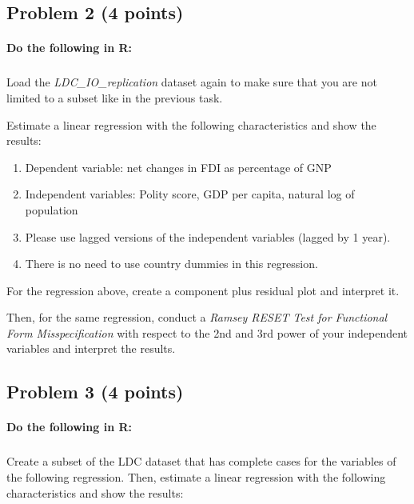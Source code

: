 \documentclass[12pt]{article}
\begin{document}
\subsection*{Problem 2 (4 points)}

\paragraph{Do the following in R:}

\subparagraph{} Load the \textit{LDC\_IO\_replication} dataset again to make sure that you are not limited to a subset like in the previous task.

\bigskip

Estimate a linear regression with the following characteristics and show the results:

\begin{enumerate}
	\item Dependent variable: net changes in FDI as percentage of GNP
	\item Independent variables: Polity score, GDP per capita, natural log of population
	\item Please use lagged versions of the independent variables (lagged by 1 year).
	\item There is no need to use country dummies in this regression.
\end{enumerate}

\bigskip

For the regression above, create a component plus residual plot and interpret it.

\bigskip

Then, for the same regression,  conduct a \textit{Ramsey RESET Test for Functional Form Misspecification} with respect to the 2nd and 3rd power of your independent variables and interpret the results.



\subsection*{Problem 3 (4 points)}

\paragraph{Do the following in R:}

\subparagraph{} Create a subset of the LDC dataset that has complete cases for the variables of the following regression. Then, estimate a linear regression with the following characteristics and show the results:
\end{document}
